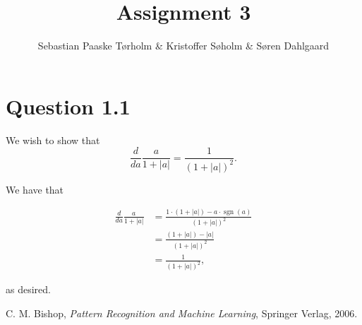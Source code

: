 \documentclass[11pt,a4paper]{article}
\title{Assignment 3}
\author{Sebastian Paaske Tørholm \& Kristoffer Søholm \& Søren Dahlgaard}
\DeclareMathOperator{\sgn}{sgn}
\begin{document}
\maketitle

\section{Question 1.1}

We wish to show that
\[
    \frac{d}{da} \frac{a}{1+|a|} = \frac{1}{(1+|a|)^2}.
\]

We have that

\begin{align}
    \frac{d}{da} \frac{a}{1+|a|} &= \frac{1 \cdot (1+|a|) - a \cdot \sgn(a)}{(1+|a|)^2} \\
                                 &= \frac{(1 + |a|) - |a|}{(1+|a|)^2} \\
                                 &= \frac{1}{(1+|a|)^2},
\end{align}

as desired.

\begin{thebibliography}{9}
        C. M. Bishop,
        \emph{Pattern Recognition and Machine Learning},
        Springer Verlag,
        2006.
\end{thebibliography}
\end{document}
